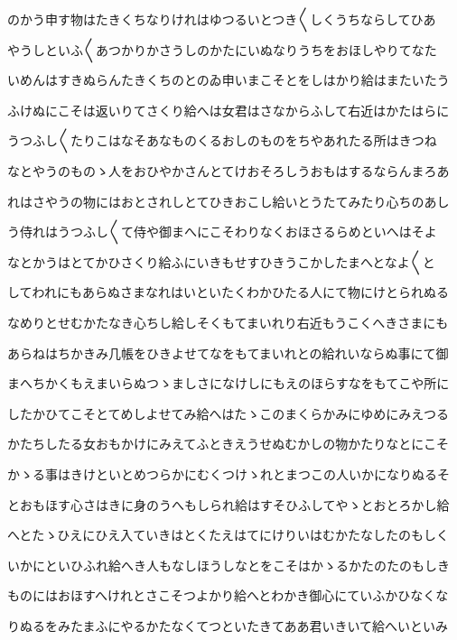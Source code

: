 \documentclass[a4paper,11pt,landscape]{ltjtarticle}
\begin{document}
\par\medskip
のかう申す物はたきくちなりけれはゆつるいとつき〱しくうちならしてひあ
\par\medskip
やうしといふ〱あつかりかさうしのかたにいぬなりうちをおほしやりてなた
\par\medskip
いめんはすきぬらんたきくちのとのゐ申いまこそとをしはかり給はまたいたう
\par\medskip
ふけぬにこそは返いりてさくり給へは女君はさなからふして右近はかたはらに
\par\medskip
うつふし〱たりこはなそあなものくるおしのものをちやあれたる所はきつね
\par\medskip
なとやうのものゝ人をおひやかさんとてけおそろしうおもはするならんまろあ
\par\medskip
れはさやうの物にはおとされしとてひきおこし給いとうたてみたり心ちのあし
\par\medskip
う侍れはうつふし〱て侍や御まへにこそわりなくおほさるらめといへはそよ
\par\medskip
なとかうはとてかひさくり給ふにいきもせすひきうこかしたまへとなよ〱と
\par\medskip
してわれにもあらぬさまなれはいといたくわかひたる人にて物にけとられぬる
\par\medskip
なめりとせむかたなき心ちし給しそくもてまいれり右近もうこくへきさまにも
\par\medskip
あらねはちかきみ几帳をひきよせてなをもてまいれとの給れいならぬ事にて御
\par\medskip
まへちかくもえまいらぬつゝましさになけしにもえのほらすなをもてこや所に
\par\medskip
したかひてこそとてめしよせてみ給へはたゝこのまくらかみにゆめにみえつる
\par\medskip
かたちしたる女おもかけにみえてふときえうせぬむかしの物かたりなとにこそ
\par\medskip
かゝる事はきけといとめつらかにむくつけゝれとまつこの人いかになりぬるそ
\par\medskip
とおもほす心さはきに身のうへもしられ給はすそひふしてやゝとおとろかし給
\par\medskip
へとたゝひえにひえ入ていきはとくたえはてにけりいはむかたなしたのもしく
\par\medskip
いかにといひふれ給へき人もなしほうしなとをこそはかゝるかたのたのもしき
\par\medskip
ものにはおほすへけれとさこそつよかり給へとわかき御心にていふかひなくな
\par\medskip
りぬるをみたまふにやるかたなくてつといたきてああ君いきいて給へいといみ
\par\medskip
\end{document}
